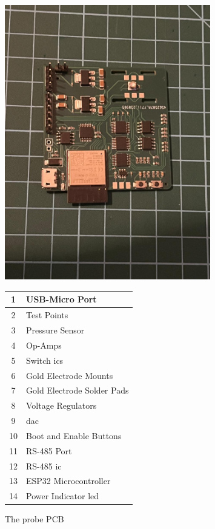 \begin{figure}[ht] %
    \begin{minipage}{0.5\textwidth}
        \centering
        \includegraphics[width=0.8\textwidth]{Figures/probe_pcb.jpg}
    \end{minipage}
    \begin{minipage}{0.5\textwidth}
        \centering
        \begin{tabular}{cl} \hline
            1 & USB-Micro Port \\ \hline
            2 & Test Points \\ \hline
            3 & Pressure Sensor \\ \hline
            4 & Op-Amps \\ \hline
            5 & Switch \gls{ic}s \\ \hline
            6 & Gold Electrode Mounts \\ \hline
            7 & Gold Electrode Solder Pads \\ \hline
            8 & Voltage Regulators \\ \hline
            9 & \gls{dac} \\ \hline
            10 & Boot and Enable Buttons\\ \hline
            11 & RS-485 Port \\ \hline
            12 & RS-485 \gls{ic} \\ \hline
            13 & ESP32 Microcontroller \\ \hline
            14 & Power Indicator \gls{led} \\ \hline
        \end{tabular}
    \end{minipage}
    \caption{The probe PCB}
    \label{fig:probe_pcb} %
\end{figure}


